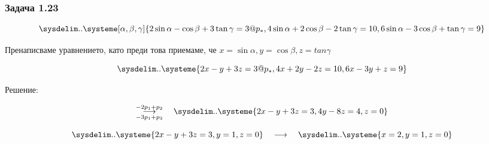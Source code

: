 \documentclass{subfiles}
\begin{document}
\subsubsection{Задача 1.23}

\begin{equation*}
    \sysdelim..\systeme[\alpha,\beta,\gamma]{
        2\sin\alpha - \cos\beta + 3\tan\gamma = 3@p_{*},
        4\sin\alpha + 2\cos\beta - 2\tan\gamma = 10,
        6\sin\alpha - 3\cos\beta + \tan\gamma = 9
    }
\end{equation*}

\noindent Пренаписваме уравнението, като преди това приемаме, че $ x = \sin\alpha, y = \cos\beta, z = tan\gamma $

\begin{equation*}
    \sysdelim..\systeme{
        2x - y + 3z = 3@p_{*},
        4x + 2y - 2z = 10,
        6x - 3y + z = 9
    }
\end{equation*}

\noindent Решение:

\begin{equation*}
    \overset{-2p_{1} + p_{2}}{\underset{-3p_{1} + p_{3}}{\longrightarrow}}
    \quad
    \sysdelim..\systeme{
        2x - y + 3z = 3,
        4y - 8z = 4,
        z = 0
    }
\end{equation*}

\begin{equation*}
    \sysdelim..\systeme{
        2x - y + 3z = 3,
        y = 1,
        z = 0
    }
    \quad
    \longrightarrow
    \quad
    \sysdelim..\systeme{
        x = 2,
        y = 1,
        z = 0
    }
\end{equation*}
\end{document}
